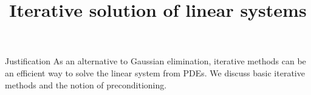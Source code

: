 \documentclass[11pt]{beamer}
\begin{document}
\title{Iterative solution of linear systems}
\author{\hpcteachers}
\date{\hpcsemester}

\begin{frame}
  \titlepage
\end{frame}

\begin{frame}{Justification}
  As an alternative to Gaussian elimination, iterative methods can be
  an efficient way to solve the linear system from PDEs. We discuss
  basic iterative methods and the notion of preconditioning.
\end{frame}






\begin{longstory}
  
  
  
\end{longstory}
\end{document}
